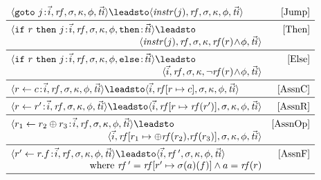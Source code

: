 \begin{figure}[t]
\begin{subfigure}{\columnwidth}
\begin{displaymath}
\begin{array}{lr}

      \langle \texttt{goto}\ j\cpair\vec{i}, \var{rf}, \sigma, \kappa, \phi, \vec{\var{ti}} \rangle
      \leadsto
      \langle \var{instr}(j), \var{rf}, \sigma, \kappa, \phi, \vec{\var{ti}} \rangle
      & \text{[Jump]}

      \\ \midrule

    \langle \mathtt{if}\ r\ \mathtt{then}\ j\cpair\vec{i}, \var{rf}, \sigma, \kappa, \phi, \mathtt{then}\cpair\vec{\var{ti}} \rangle
      \leadsto
      & \text{[Then]} \\
      \multicolumn{1}{r}{\langle \var{instr}(j), \var{rf}, \sigma, \kappa, \var{rf}(r)\!\wedge\!\phi, \vec{\var{ti}} \rangle}
      \\ \midrule

      \langle \mathtt{if}\ r\ \mathtt{then}\ j\cpair\vec{i}, \var{rf}, \sigma, \kappa, \phi, \mathtt{else}\cpair\vec{\var{ti}} \rangle
      \leadsto
      & \text{[Else]} \\
      \multicolumn{1}{r}{\langle \vec{i}, \var{rf}, \sigma, \kappa, \neg \var{rf}(r)\!\wedge\!\phi, \vec{\var{ti}} \rangle}
      \\ \midrule
                   
      \langle r \leftarrow c\cpair\vec{i},\var{rf},\sigma,\kappa,\phi, \vec{\var{ti}} \rangle
      \leadsto
      \langle \vec{i}, \var{rf} [ r \mapsto c ],\sigma,\kappa,\phi, \vec{\var{ti}} \rangle
      & \text{[AssnC]}
      \\ \midrule

      \langle r \leftarrow r'\cpair\vec{i},\var{rf},\sigma,\kappa,\phi, \vec{\var{ti}} \rangle
      \leadsto
      \langle \vec{i}, \var{rf} [ r \mapsto \var{rf}(r') ],\sigma,\kappa,\phi, \vec{\var{ti}} \rangle
      & \text{[AssnR]}
      \\ \midrule

      \langle r_1 \leftarrow r_2\oplus r_3\cpair\vec{i},\var{rf},\sigma,\kappa,\phi, \vec{\var{ti}} \rangle
      \leadsto & \text{[AssnOp]} \\
      \multicolumn{1}{r}{\langle \vec{i}, \var{rf} [ r_1 \mapsto \oplus\var{rf}(r_2),\!\var{rf}(r_3) ],\sigma,\kappa,\phi, \vec{\var{ti}} \rangle}
      \\ \midrule

      \langle r' \leftarrow r.f\cpair\vec{i}, \var{rf}, \sigma, \kappa,\phi, \vec{\var{ti}} \rangle
      \leadsto
      \langle \vec{i}, \var{rf}\ \!', \sigma, \kappa,\phi, \vec{\var{ti}} \rangle
      & \text{[AssnF]} \\
      \multicolumn{1}{r}{\text{where } \var{rf}\ \!' = \var{rf}[r' \mapsto \sigma(\absval)(f)]
      \wedge \absval = \var{rf}(r)}
      \\ \midrule


\end{array}
\end{displaymath}
\end{subfigure}
\end{figure}
